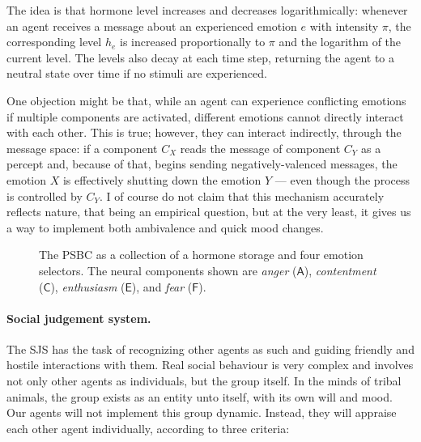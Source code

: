 The idea is that hormone level increases and decreases logarithmically: whenever an agent receives a message about an experienced emotion $e$ with intensity $\pi$, the corresponding level $h_e$ is increased proportionally to $\pi$ and the logarithm of the current level. The levels also decay at each time step, returning the agent to a neutral state over time if no stimuli are experienced.

One objection might be that, while an agent can experience conflicting emotions if multiple components are activated, different emotions cannot directly interact with each other. This is true; however, they can interact indirectly, through the message space: if a component $C_X$ reads the message of component $C_Y$ as a percept and, because of that, begins sending negatively-valenced messages, the emotion $X$ is effectively shutting down the emotion $Y$ --- even though the process is controlled by $C_Y$. I of course do not claim that this mechanism accurately reflects nature, that being an empirical question, but at the very least, it gives us a way to implement both ambivalence and quick mood changes.

\begin{figure}
	\centering
	
	\caption{The PSBC as a collection of a hormone storage and four emotion selectors. The neural components shown are {\em anger} ($\mathsf{A}$), {\em contentment} ($\mathsf{C}$), {\em enthusiasm} ($\mathsf{E}$), and {\em fear} ($\mathsf{F}$).}
	\label{fig:PSBC_system}
\end{figure}

\paragraph{Social judgement system.} The SJS has the task of recognizing other agents as such and guiding friendly and hostile interactions with them. Real social behaviour is very complex and involves not only other agents as individuals, but the group itself. In the minds of tribal animals, the group exists as an entity unto itself, with its own will and mood. Our agents will not implement this group dynamic. Instead, they will appraise each other agent individually, according to three criteria:

